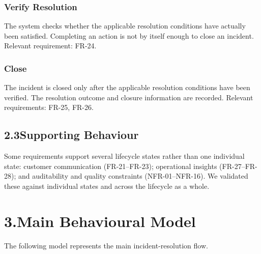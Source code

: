 \documentclass[11pt,a4paper]{article}
\begin{document}
\subsubsection*{Verify Resolution}
The system checks whether the applicable resolution conditions have actually been satisfied. Completing an action is not by itself enough to close an incident. Relevant requirement: FR-24.

\subsubsection*{Close}
The incident is closed only after the applicable resolution conditions have been verified. The resolution outcome and closure information are recorded. Relevant requirements: FR-25, FR-26.

\subsection*{2.3\enspace Supporting Behaviour}

Some requirements support several lifecycle states rather than one individual state: customer communication (FR-21–FR-23); operational insights (FR-27–FR-28); and auditability and quality constraints (NFR-01–NFR-16). We validated these against individual states and across the lifecycle as a whole.

\section*{3.\enspace Main Behavioural Model}

The following model represents the main incident-resolution flow.
\end{document}
